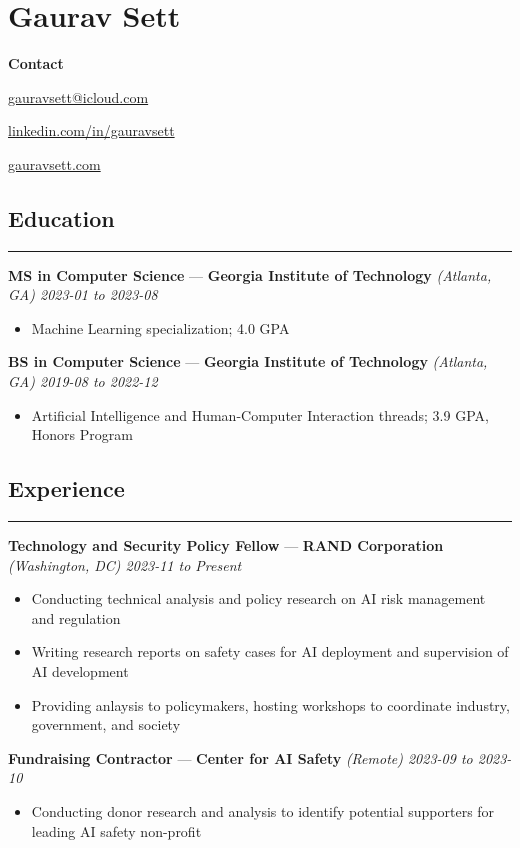 \documentclass[10pt]{article}
\newcommand{\resumeHeading}[1]{
    \subsection*{#1}
    \hrule
    \vspace*{5pt}
}
\newcommand{\resumeSubHeading}[5]{
    \vspace*{5pt}
    \textbf{#1} — \textbf{#2} \textsl{(#3) \hfill #4 to #5}
}
\begin{document}
\section*{Gaurav Sett}

\textbf{Contact}
\begin{itemize*}[label=$|$]
    \item \href{mailto:gauravsett@icloud.com}{gauravsett@icloud.com}
    \item \href{https://linkedin.com/in/gauravsett}{linkedin.com/in/gauravsett}
    \item \href{https://gauravsett.com}{gauravsett.com}
\end{itemize*}



\resumeHeading{Education}

\resumeSubHeading
    {MS in Computer Science}
    {Georgia Institute of Technology}
    {Atlanta, GA}
    {2023-01}
    {2023-08}
\begin{itemize}
    \item Machine Learning specialization; 4.0 GPA
\end{itemize}

\resumeSubHeading
    {BS in Computer Science}
    {Georgia Institute of Technology}
    {Atlanta, GA}
    {2019-08}
    {2022-12}
\begin{itemize}
    \item Artificial Intelligence and Human-Computer Interaction threads; 3.9 GPA, Honors Program
\end{itemize}



\resumeHeading{Experience \vspace{-2.5pt}}

\resumeSubHeading
    {Technology and Security Policy Fellow}
    {RAND Corporation}
    {Washington, DC}
    {2023-11}
    {Present}
\begin{itemize}
    \item Conducting technical analysis and policy research on AI risk management and regulation
    \item Writing research reports on safety cases for AI deployment and supervision of AI development
    \item Providing anlaysis to policymakers, hosting workshops to coordinate industry, government, and society
\end{itemize}

\resumeSubHeading
    {Fundraising Contractor}
    {Center for AI Safety}
    {Remote}
    {2023-09}
    {2023-10}
\begin{itemize}
    \item Conducting donor research and analysis to identify potential supporters for leading AI safety non-profit
\end{itemize}
\end{document}
